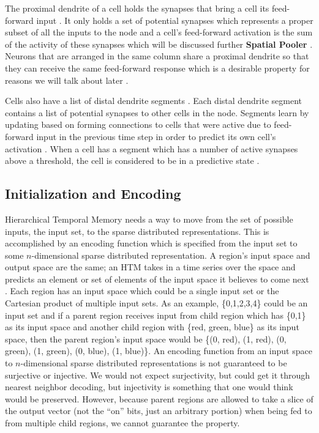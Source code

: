 \documentclass[fleqn,notitlepage,minimal]{article}
\begin{document}
	The proximal dendrite of a cell holds the synapses that bring a cell its feed-forward input \cite{Principles}. It only holds a set of potential synapses which represents a proper subset of all the inputs to the node and a cell's feed-forward activation is the sum of the activity of these synapses which will be discussed further \textbf{Spatial Pooler} \cite{Whitepaper}. Neurons that are arranged in the same column share a proximal dendrite so that they can receive the same feed-forward response which is a desirable property for reasons we will talk about later \cite{Whitepaper}.
	
	Cells also have a list of distal dendrite segments \cite{Whitepaper}. Each distal dendrite segment contains a list of potential synapses to other cells in the node. Segments learn by updating based on forming connections to cells that were active due to feed-forward input in the previous time step in order to predict its own cell's activation \cite{Whitepaper}. When a cell has a segment which has a number of active synapses above a threshold, the cell is considered to be in a predictive state \cite{Principles}.
	
	\subsection{Initialization and Encoding}
	
	Hierarchical Temporal Memory needs a way to move from the set of possible inputs, the input set, to the sparse distributed representations. This is accomplished by an encoding function which is specified from the input set to some $n$-dimensional sparse distributed representation. A region's input space and output space are the same; an HTM takes in a time series over the space and predicts an element or set of elements of the input space it believes to come next \cite{Purdy}. Each region has an input space which could be a single input set or the Cartesian product of multiple input sets. As an example, \{0,1,2,3,4\} could be an input set and if a parent region receives input from child region which has \{0,1\} as its input space and another child region with \{red, green, blue\} as its input space, then the parent region's input space would be \{(0, red), (1, red), (0, green), (1, green), (0, blue), (1, blue)\}. An encoding function from an input space to $n$-dimensional sparse distributed representations is not guaranteed to be surjective or injective. We would not expect surjectivity, but could get it through nearest neighbor decoding, but injectivity is something that one would think would be preserved. However, because parent regions are allowed to take a slice of the output vector (not the ``on'' bits, just an arbitrary portion) when being fed to from multiple child regions, we cannot guarantee the property.
	
\end{document}
